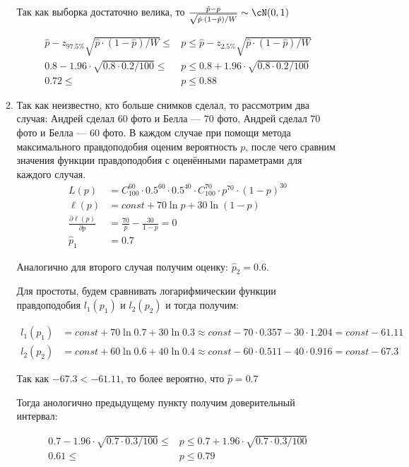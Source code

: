 \begin{enumerate}
\begin{enumerate}
Так как выборка достаточно велика, то $\frac{\hat{p}-p}{\sqrt{\hat{p}\cdot(1-\hat{p})/W}}\sim \cN(0,1)$

\begin{align*}
\hat{p}-z_{97.5\%}\sqrt{\hat{p}\cdot(1-\hat{p})/W} \le &p \le \hat{p}-z_{2.5\%}\sqrt{\hat{p}\cdot(1-\hat{p})/W} \\
0.8-1.96\cdot\sqrt{0.8\cdot0.2/100}\le &p\le0.8+1.96\cdot\sqrt{0.8\cdot0.2/100} \\
0.72\le &p\le 0.88
\end{align*}

\item Так как неизвестно, кто больше снимков сделал, то рассмотрим два случая: Андрей сделал 60 фото и Белла — 70 фото, Андрей сделал 70 фото и Белла — 60 фото. В каждом случае при помощи метода максимального правдоподобия оценим вероятность $p$, после чего сравним значения функции правдоподобия с оценёнными параметрами для каждого случая.
\begin{align*}
L(p)&=C^{60}_{100}\cdot 0.5^{60}\cdot 0.5^{40}\cdot C^{70}_{100}\cdot p^{70}\cdot(1-p)^{30} \\
\ell(p)&=const+70\ln p+30\ln(1-p) \\
\frac{\partial \ell (p)}{\partial p}&= \frac{70}{p}-\frac{30}{1-p}=0 \\
\hat{p}_1 &= 0.7
\end{align*}

Аналогично для второго случая получим оценку: $\hat{p}_2=0.6$.

Для простоты, будем сравнивать логарифмическии функции правдоподобия $l_1(p_1)$ и $l_2(p_2)$ и тогда получим:

\begin{align*}
l_1(p_1)&=const+70\ln 0.7+30\ln 0.3\approx const-70\cdot0.357-30\cdot 1.204=const-61.11 \\
l_2(p_2)&=const+60\ln 0.6+40\ln 0.4\approx const-60\cdot0.511-40\cdot0.916=const-67.3
\end{align*}

Так как $-67.3<-61.11$, то более вероятно, что $\hat{p}=0.7$

Тогда анологично предыдущему пункту получим доверительный интервал:

\begin{align*}
0.7-1.96\cdot\sqrt{0.7\cdot0.3/100}\le &p \le0.7+1.96\cdot\sqrt{0.7\cdot0.3/100} \\
0.61 \le &p \le 0.79
\end{align*}
\end{enumerate}
\end{enumerate}
